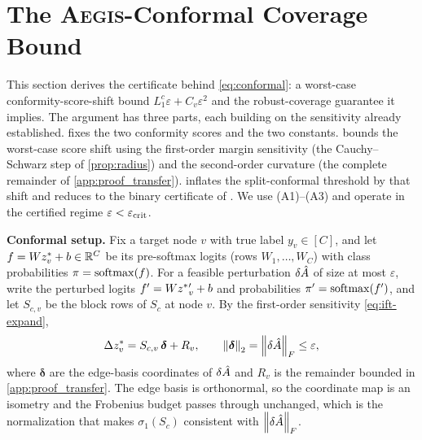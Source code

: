 \section{The \textsc{Aegis}-Conformal Coverage Bound}
\label{app:conformal}

This section derives the certificate behind \cref{eq:conformal}: a worst-case conformity-score-shift
bound $L_1^{c}\varepsilon+C_v\varepsilon^2$ and the robust-coverage guarantee it implies. The argument
has three parts, each building on the sensitivity already established.  fixes the
two conformity scores and the two constants.  bounds the worst-case score shift
using the first-order margin sensitivity (the Cauchy--Schwarz step of \cref{prop:radius}) and the
second-order curvature (the complete remainder of \cref{app:proof_transfer}). 
inflates the split-conformal threshold by that shift and reduces to the binary certificate of
\citet{zargarbashi2023conformal}. We use (A1)--(A3) and operate in the certified regime
$\varepsilon<\varepsilon_{\mathrm{crit}}$.

\medskip\noindent\textbf{Conformal setup.}\quad
Fix a target node $v$ with true label $y_v\in[C]$, and let $f=Wz^{*}_v+b\in\mathbb{R}^{C}$ be its pre-softmax
logits (rows $W_1,\dots,W_C$) with class probabilities $\pi=\operatorname{softmax}(f)$. For a feasible perturbation
$\delta\hat{A}$ of size at most $\varepsilon$, write the perturbed logits $f'=Wz^{*}{}'_v+b$ and
probabilities $\pi'=\operatorname{softmax}(f')$, and let $S_{c,v}$ be the block rows of $S_c$ at node $v$. By the
first-order sensitivity \eqref{eq:ift-expand},
\begin{equation}
\Delta z^{*}_v=S_{c,v}\,\boldsymbol\delta+R_v,\qquad
\left\|\boldsymbol\delta\right\|_2=\left\|\delta\hat{A}\right\|_F\le\varepsilon,
\label{eq:ift-firstorder}
\end{equation}
where $\boldsymbol\delta$ are the edge-basis coordinates of $\delta\hat{A}$ and $R_v$ is the remainder
bounded in \cref{app:proof_transfer}. The edge basis is orthonormal, so the coordinate map is an
isometry and the Frobenius budget passes through unchanged, which is the normalization that makes
$\sigma_1(S_c)$ consistent with $\left\|\delta\hat{A}\right\|_F$.

